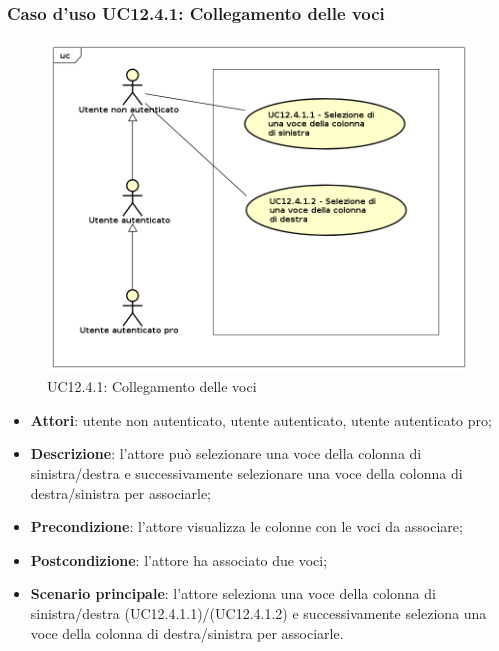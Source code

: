 \subsubsection{Caso d'uso UC12.4.1: Collegamento delle voci}
\label{UC12.4.1}
\begin{figure}[h]
	\centering
	\includegraphics[scale=0.5]{UML/UC12_4_1.png}
	\caption{UC12.4.1: Collegamento delle voci}
\end{figure}
\begin{itemize}
\item \textbf{Attori}: utente non autenticato, utente autenticato, utente autenticato pro;
\item \textbf{Descrizione}: l'attore può selezionare una voce della colonna di sinistra/destra e successivamente selezionare una voce della colonna di destra/sinistra per associarle;
\item \textbf{Precondizione}: l'attore visualizza le colonne con le voci da associare;
\item \textbf{Postcondizione}: l'attore ha associato due voci;
\item \textbf{Scenario principale}: l'attore seleziona una voce della colonna di sinistra/destra (UC12.4.1.1)/(UC12.4.1.2) e successivamente seleziona una voce della colonna di destra/sinistra per associarle.
\end{itemize}

